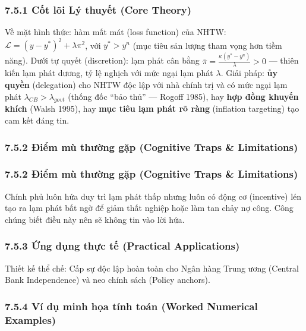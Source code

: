 \documentclass[
]{article}
\begin{document}
\subsubsection{7.5.1 Cốt lõi Lý thuyết (Core
Theory)}\label{cux1ed1t-luxf5i-luxfd-thuyux1ebft-core-theory-20}

Về mặt hình thức: hàm mất mát (loss function) của NHTW:
\(\mathcal{L} = (y - y^*)^2 + \lambda \pi^2\), với \(y^* > y^n\) (mục
tiêu sản lượng tham vọng hơn tiềm năng). Dưới tự quyết (discretion): lạm
phát cân bằng \(\bar{\pi} = \frac{\kappa(y^* - y^n)}{\lambda} > 0\) ---
thiên kiến lạm phát dương, tỷ lệ nghịch với mức ngại lạm phát
\(\lambda\). Giải pháp: \textbf{ủy quyền} (delegation) cho NHTW độc lập
với nhà chính trị và có mức ngại lạm phát
\(\lambda_{CB} > \lambda_{govt}\) (thống đốc ``bảo thủ'' --- Rogoff
1985), hay \textbf{hợp đồng khuyến khích} (Walsh 1995), hay \textbf{mục
tiêu lạm phát rõ ràng} (inflation targeting) tạo cam kết đáng tin.

\subsubsection{7.5.2 Điểm mù thường gặp (Cognitive Traps \&
Limitations)}\label{ux111iux1ec3m-muxf9-thux1b0ux1eddng-gux1eb7p-cognitive-traps-limitations-39}

\subsubsection{7.5.2 Điểm mù thường gặp (Cognitive Traps \&
Limitations)}\label{ux111iux1ec3m-muxf9-thux1b0ux1eddng-gux1eb7p-cognitive-traps-limitations-40}

Chính phủ luôn hứa duy trì lạm phát thấp nhưng luôn có động cơ
(incentive) lén tạo ra lạm phát bất ngờ để giảm thất nghiệp hoặc làm tan
chảy nợ công. Công chúng biết điều này nên sẽ không tin vào lời hứa.

\subsubsection{7.5.3 Ứng dụng thực tế (Practical
Applications)}\label{ux1ee9ng-dux1ee5ng-thux1ef1c-tux1ebf-practical-applications-21}

Thiết kế thể chế: Cấp sự độc lập hoàn toàn cho Ngân hàng Trung ương
(Central Bank Independence) và neo chính sách (Policy anchors).

\subsubsection{7.5.4 Ví dụ minh họa tính toán (Worked Numerical
Examples)}\label{vuxed-dux1ee5-minh-hux1ecda-tuxednh-touxe1n-worked-numerical-examples-20}
\end{document}
